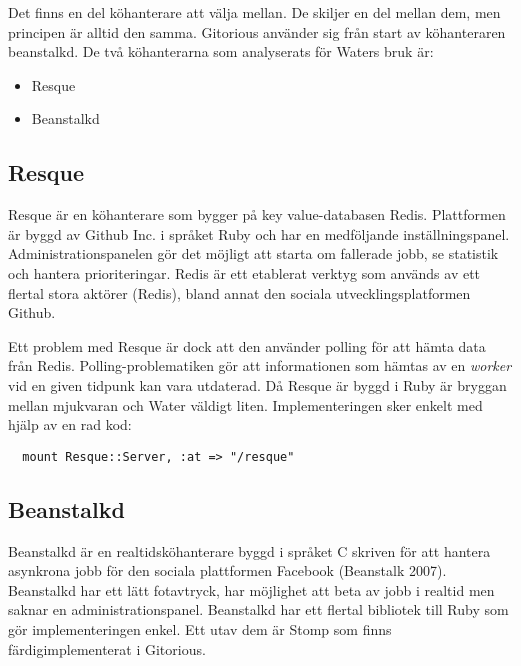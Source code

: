 Det finns en del köhanterare att välja mellan. De skiljer en del mellan dem, men principen är alltid den samma. Gitorious använder sig från start av köhanteraren beanstalkd.
De två köhanterarna som analyserats för Waters bruk är:

\begin{itemize}
  \item Resque
  \item Beanstalkd
\end{itemize}

\subsection{Resque}

Resque är en köhanterare som bygger på key value-databasen Redis. Plattformen
är byggd av Github Inc. i språket Ruby och har en medföljande
inställningspanel. Administrationspanelen gör det möjligt att starta om
fallerade jobb, se statistik och hantera prioriteringar. Redis är ett etablerat
verktyg som används av ett flertal stora aktörer (Redis), bland annat den sociala utvecklingsplatformen Github.

Ett problem med Resque är dock att den använder polling för att hämta data från
Redis. Polling-problematiken gör att informationen som hämtas av en \emph{worker} vid
en given tidpunk kan vara utdaterad. Då Resque är byggd i Ruby är bryggan
mellan mjukvaran och Water väldigt liten. Implementeringen sker enkelt med
hjälp av en rad kod:

\begin{verbatim}
  mount Resque::Server, :at => "/resque"
\end{verbatim}

\subsection{Beanstalkd}
Beanstalkd är en realtidsköhanterare byggd i språket C skriven för att hantera asynkrona jobb för den sociala plattformen Facebook (Beanstalk 2007). Beanstalkd har ett lätt fotavtryck, har möjlighet att beta av jobb i realtid men saknar en administrationspanel.
Beanstalkd har ett flertal bibliotek till Ruby som gör implementeringen enkel. Ett utav dem är Stomp som finns färdigimplementerat i Gitorious.

